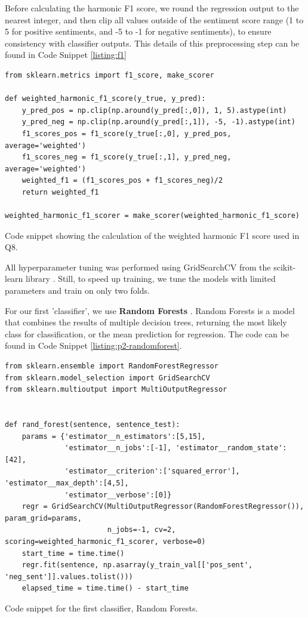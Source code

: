 Before calculating the harmonic F1 score, we round the regression output to the nearest integer, and then clip all values outside of the sentiment score range (1 to 5 for positive sentiments, and -5 to -1 for negative sentiments), to ensure consistency with classifier outputs. This details of this preprocessing step can be found in Code Snippet \ref{listing:f1}

\begin{listing*}
\begin{verbatim}
from sklearn.metrics import f1_score, make_scorer

def weighted_harmonic_f1_score(y_true, y_pred):
    y_pred_pos = np.clip(np.around(y_pred[:,0]), 1, 5).astype(int)
    y_pred_neg = np.clip(np.around(y_pred[:,1]), -5, -1).astype(int)
    f1_scores_pos = f1_score(y_true[:,0], y_pred_pos, average='weighted')
    f1_scores_neg = f1_score(y_true[:,1], y_pred_neg, average='weighted')
    weighted_f1 = (f1_scores_pos + f1_scores_neg)/2
    return weighted_f1

weighted_harmonic_f1_scorer = make_scorer(weighted_harmonic_f1_score)

\end{verbatim}
\caption{Code snippet showing the calculation of the weighted harmonic F1 score used in Q8.}
\label{listing:f1}
\end{listing*}


All hyperparameter tuning was performed using GridSearchCV from the scikit-learn library \cite{sklearn1, sklearn2}. Still, to speed up training, we tune the models with limited parameters and train on only two folds.

For our first 'classifier', we use \textbf{Random Forests} \cite{randomforest}. Random Forests is a model that combines the results of multiple decision trees, returning the most likely class for classification, or the mean prediction for regression. The code can be found in Code Snippet \ref{listing:p2-randomforest}.

\begin{listing*}
\begin{verbatim}
from sklearn.ensemble import RandomForestRegressor
from sklearn.model_selection import GridSearchCV
from sklearn.multioutput import MultiOutputRegressor


def rand_forest(sentence, sentence_test):
    params = {'estimator__n_estimators':[5,15],
              'estimator__n_jobs':[-1], 'estimator__random_state':[42],
              'estimator__criterion':['squared_error'], 'estimator__max_depth':[4,5],
              'estimator__verbose':[0]}
    regr = GridSearchCV(MultiOutputRegressor(RandomForestRegressor()), param_grid=params,
                        n_jobs=-1, cv=2, scoring=weighted_harmonic_f1_scorer, verbose=0)
    start_time = time.time()
    regr.fit(sentence, np.asarray(y_train_val[['pos_sent', 'neg_sent']].values.tolist()))
    elapsed_time = time.time() - start_time

\end{verbatim}
\caption{Code snippet for the first classifier, Random Forests.}
\label{listing:p2-randomforest}
\end{listing*}

